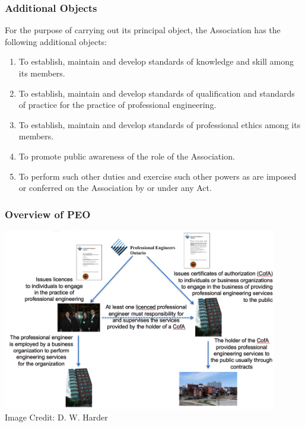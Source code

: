\begin{frame}
\frametitle{Additional Objects}


For the purpose of carrying out its principal object, the Association has the following additional objects:

\begin{enumerate}

	\item To establish, maintain and develop standards of knowledge and skill among its members.

	\item To establish, maintain and develop standards of qualification and standards of practice for the practice of professional engineering.

	\item To establish, maintain and develop standards of professional ethics among its members.

	\item To promote public awareness of the role of the Association.

	\item To perform such other duties and exercise such other powers as are imposed or conferred on the Association by or under any Act. 
	
\end{enumerate}

\end{frame}



\begin{frame}
\frametitle{Overview of PEO}

\begin{center}
	\includegraphics[width=0.9\textwidth]{images/PEO-Overview}\\
	{\scriptsize Image Credit: D. W. Harder}
\end{center}

\end{frame}



